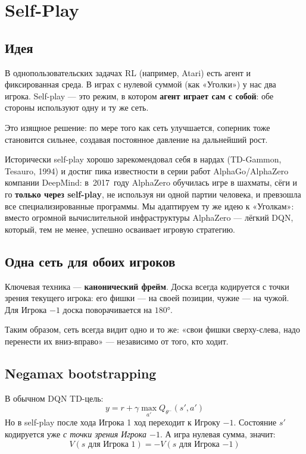 \documentclass[a4paper, 11pt]{article}
\begin{document}
\section{Self-Play}

\subsection{Идея}

В однопользовательских задачах RL (например, Atari) есть агент и
фиксированная среда. В играх с нулевой суммой (как «Уголки») у нас
два игрока. Self-play — это режим, в котором \textbf{агент играет сам с
собой}: обе стороны используют одну и ту же сеть.

Это изящное решение: по мере того как сеть улучшается, соперник тоже
становится сильнее, создавая постоянное давление на дальнейший рост.

Исторически self-play хорошо зарекомендовал себя в нардах (TD-Gammon,
Tesauro, 1994) и достиг пика известности в серии работ AlphaGo/AlphaZero
компании DeepMind: в~2017~году AlphaZero обучилась игре в шахматы, сёги и
го \textbf{только через self-play}, не используя ни одной партии человека,
и превзошла все специализированные программы. Мы адаптируем ту же идею к
«Уголкам»: вместо огромной вычислительной инфраструктуры AlphaZero —
лёгкий DQN, который, тем не менее, успешно осваивает игровую стратегию.

\subsection{Одна сеть для обоих игроков}

Ключевая техника — \textbf{канонический фрейм}. Доска всегда
кодируется с точки зрения текущего игрока: его фишки — на своей позиции,
чужие — на чужой. Для Игрока $-1$ доска поворачивается на $180°$.

Таким образом, сеть всегда видит одно и то же: «свои фишки сверху-слева,
надо перенести их вниз-вправо» — независимо от того, кто ходит.

\subsection{Negamax bootstrapping}

В обычном DQN TD-цель:
\[
  y = r + \gamma \max_{a'} Q_{\theta^-}(s', a')
\]
Но в self-play после хода Игрока 1 ход переходит к Игроку $-1$. Состояние
$s'$ кодируется уже \emph{с точки зрения Игрока $-1$}. А игра нулевая
сумма, значит:
\[
  V(s \text{ для Игрока 1}) = -V(s \text{ для Игрока } {-1})
\]
\end{document}
